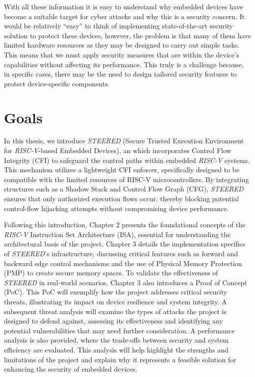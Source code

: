 With all these information it is easy to understand why embedded devices have become
a suitable target for cyber attacks and why this is a security concern. It would
be relatively ``easy'' to think of implementing state-of-the-art security
solution to protect these devices, however, the problem is that many of them
have limited hardware resources as they may be designed to carry out simple
tasks. This means that we must apply security measures that are within the device's
capabilities without affecting its performance. This truly is a challenge
because, in specific cases, there may be the need to design tailored security
features to protect device-specific components.

\section{Goals}
\label{sec:intro_goals}

In this thesis, we introduce \textit{STEERED} (Secure Trusted Execution
Environment for \textit{RISC-V}-based Embedded Devices), an which incorporates Control
Flow Integrity (CFI) to safeguard the control paths within embedded \textit{RISC-V}
systems. This mechanism utilizes a lightweight CFI enforcer, specifically
designed to be compatible with the limited resources of RISC-V microcontrollers.
By integrating structures such as a Shadow Stack and Control Flow Graph (CFG),
\textit{STEERED} ensures that only authorized execution flows occur, thereby
blocking potential control-flow hijacking attempts without compromising device
performance.

Following this introduction, Chapter $2$ presents the foundational concepts of the
\textit{RISC-V} Instruction Set Architecture (ISA), essential for understanding the
architectural basis of the project. Chapter $3$ details the implementation
specifics of \textit{STEERED}'s infrastructure, discussing critical features
such as forward and backward edge control mechanisms and the use of Physical
Memory Protection (PMP) to create secure memory spaces. To validate the effectiveness
of \textit{STEERED} in real-world scenarios, Chapter $3$ also introduces a Proof
of Concept (PoC). This PoC will exemplify how the project addresses critical
security threats, illustrating its impact on device resilience and system integrity.
A subsequent threat analysis will examine the types of attacks the project is
designed to defend against, assessing its effectiveness and identifying any potential
vulnerabilities that may need further consideration. A performance analysis is
also provided, where the trade-offs between security and system efficiency are evaluated.
This analysis will help highlight the strengths and limitations of the project
and explain why it represents a feasible solution for enhancing the security of
embedded devices.

